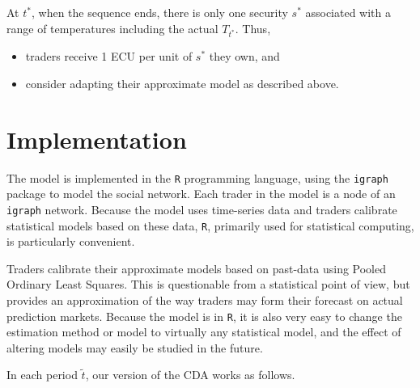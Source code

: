 \documentclass{sig-alternate}
\begin{document}
	
	At $t^*$, when the sequence ends, there is only one security $s^*$ associated with a range of temperatures including the actual $T_{t^*}$. Thus,
	\begin{itemize}
			\setlength\itemsep{0em}
		\item traders receive 1 ECU per unit of $s^*$ they own, and
		\item  consider adapting their approximate model as described above.
	\end{itemize}
	
	\section{Implementation}
	\label{implem}
	The model is implemented in the \texttt{R} programming language,  using the \texttt{igraph} package to model the social network. Each trader in the model is a node of an \texttt{igraph} network. Because the model uses time-series data and  traders calibrate statistical models based on these data, \texttt{R}, primarily used for statistical computing, is particularly convenient. 
	
	 Traders calibrate their approximate models based on past-data using Pooled Ordinary Least Squares. This is questionable from a statistical point of view, but provides an approximation of the way traders may form their forecast on actual prediction markets. Because the model is in \texttt{R}, it is also very easy to change the estimation method or model to virtually any statistical model, and the effect of altering models may easily be studied in the future.
	
	 In each period $\tilde{t}$, our version of the CDA works as follows.
	
\end{document}
